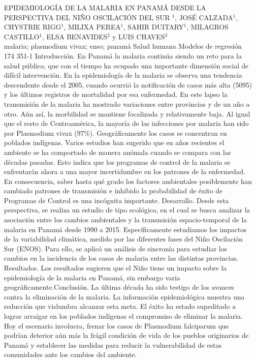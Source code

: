 \A
{EPIDEMIOLOGÍA DE LA MALARIA EN PANAMÁ DESDE LA PERSPECTIVA DEL NIÑO OSCILACIÓN DEL SUR}
{$^1$, JOSÉ CALZADA$^1$, CHYSTRIE RIGG$^1$, MILIXA PEREA$^1$, SAHIR DUITARY$^1$, MILAGROS CASTILLO$^1$, ELSA BENAVIDES$^2$ y LUIS CHAVES$^3$}
{
\\}
{malaria; plasmodium vivax; enso; panamá} 
 {Salud humana} 
 {Modelos de regresión} 
 {174} 
 {351-1}
{Introducción. En Panamá la malaria continúa siendo un reto para la salud pública; que con el tiempo ha ocupado una importante dimensión social de difícil intervención. En la epidemiología de la malaria se observa una tendencia descendente desde el 2005, cuando ocurrió la notificación de casos más alta (5095) y los últimos registros de mortalidad por esa enfermedad. En este lapso la transmisión de la malaria ha mostrado variaciones entre provincias y de un año a otro. Aún así, la morbilidad se mantiene focalizada y relativamente baja. Al igual que el resto de Centroamérica, la mayoría de las infecciones por malaria han sido por Plasmodium vivax (97\%). Geográficamente los casos se concentran en poblados indígenas. Varios estudios han sugerido que en años recientes el ambiente se ha comportado de manera anómala cuando se compara con las décadas pasadas. Esto indica que los programas de control de la malaria se enfrentarán ahora a una mayor incertidumbre en los patrones de la enfermedad. En consecuencia, saber hasta qué grado los factores ambientales posiblemente han cambiado patrones de transmisión e inhibido la probabilidad de éxito de Programas de Control es una incógnita importante. Desarrollo. Desde esta perspectiva, se realiza un estudio de tipo ecológico, en el cual se busca analizar la asociación entre los cambios ambientales y la transmisión espacio-temporal de la malaria en Panamá desde 1990 a 2015. Específicamente estudiamos los impactos de la variabilidad climática, medido por las diferentes fases del Niño Oscilación Sur (ENOS). Para ello, se aplicó un análisis de sincronía para estudiar los cambios en la incidencia de los casos de malaria entre las distintas provincias. Resultados. Los resultados sugieren que el Niño tiene un impacto sobre la epidemiología de la malaria en Panamá, sin embargo varia geográficamente.Conclusión. La última década ha sido testigo de los avances contra la eliminación de la malaria. La información epidemiológica muestra una reducción que vislumbra alcanzar esta meta. El éxito ha estado supeditado a lograr arraigar en los poblados indígenas el compromiso de eliminar la malaria. Hoy el escenario involucra, frenar los casos de Plasmodium falciparum que podrían deterior aún más la frágil condición de vida de los pueblos originarios de Panamá y establecer las medidas para reducir la vulnerabilidad de estas comunidades ante los cambios del ambiente.}
